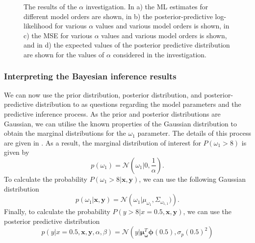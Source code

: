 \documentclass{article}
\begin{document}
\begin{figure}
\caption{The results of the $\alpha$ investigation. In a) the ML estimates for different model orders are shown, in b) the posterior-predictive log-likelihood for various $\alpha$ values and various model orders is shown, in c) the MSE for various $\alpha$ values and various model orders is shown, and in d) the expected values of the posterior predictive distribution are shown for the values of $\alpha$ considered in the investigation.}
\label{fig:Q2_hyper_parameters}
\end{figure}

\subsubsection{Interpreting the Bayesian inference results}
We can now use the prior distribution, posterior distribution, and posterior-predictive distribution to as questions regarding the model parameters and the predictive inference process. As the prior and posterior distributions are Gaussian, we can utilise the known properties of the Gaussian distribution to obtain the marginal distributions for the $\omega_1$ parameter. The details of this process are given in \citeauthor*{bishop2006} \cite{bishop2006}. As a result, the marginal distribution of interest for $P(\omega_1 > 8)$ is given by
\begin{equation}
p(\omega_1) = \mathcal{N}\left(\omega_1 \vert 0, \frac{1}{\alpha}\right).
\end{equation}
To calculate the probability $P(\omega_1 > 8 \vert \mathbf{x}, \mathbf{y})$, we can use the following Gaussian distribution
\begin{equation}
p(\omega_1 \vert \mathbf{x}, \mathbf{y}) = \mathcal{N}\left(\omega_1 \vert \mu_{\omega_1}, \Sigma_{\omega_{1,1}}) \right).
\end{equation}
Finally, to calculate the probability $P(y > 8 \vert x = 0.5, \mathbf{x}, \mathbf{y})$, we can use the posterior predictive distribution 
\begin{equation}
p(y \vert x = 0.5, \mathbf{x}, \mathbf{y}, \alpha, \beta) = \mathcal{N}(y \vert \boldsymbol\mu^{T}_{\boldsymbol\omega} \boldsymbol\phi(0.5), \sigma_p(0.5)^2)
\end{equation}
\end{document}
